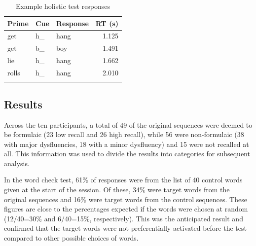 \documentclass[output=paper]{langscibook}
\begin{document}
\begin{table}
\begin{tabular}{lllr}
\lsptoprule
Prime  & Cue & Response & RT (s)\\\midrule
get & h\_ & hang & 1.125\\
get & b\_ & boy & 1.491\\
lie & h\_ & hang & 1.662\\
rolls & h\_ & hang & 2.010\\
\lspbottomrule
\end{tabular}
\caption{Example holistic test responses\label{tab:cutler:5}}
\end{table}

\subsection{Results}

Across the ten participants, a total of 49 of the original sequences were deemed to be formulaic (23 low recall and 26 high recall), while 56 were non-formulaic (38 with major dysfluencies, 18 with a minor dysfluency) and 15 were not recalled at all. This information was used to divide the results into categories for subsequent analysis.

In the word check test, 61\% of responses were from the list of 40 control words given at the start of the session. Of these, 34\% were target words from the original sequences and 16\% were target words from the control sequences. These figures are close to the percentages expected if the words were chosen at random (12/40=30\% and 6/40=15\%, respectively). This was the anticipated result and confirmed that the target words were not preferentially activated before the test compared to other possible choices of words.


\end{document}
